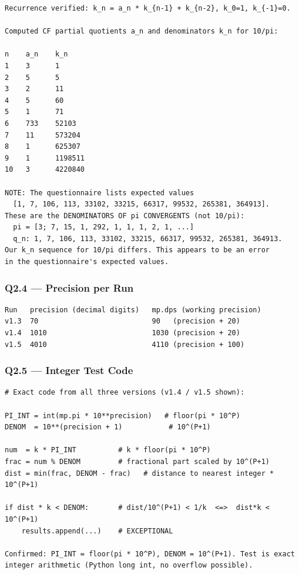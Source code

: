 \documentclass[11pt,a4paper]{article}
\begin{document}
\begin{lstlisting}
Recurrence verified: k_n = a_n * k_{n-1} + k_{n-2}, k_0=1, k_{-1}=0.

Computed CF partial quotients a_n and denominators k_n for 10/pi:

n    a_n    k_n
1    3      1
2    5      5
3    2      11
4    5      60
5    1      71
6    733    52103
7    11     573204
8    1      625307
9    1      1198511
10   3      4220840

NOTE: The questionnaire lists expected values
  [1, 7, 106, 113, 33102, 33215, 66317, 99532, 265381, 364913].
These are the DENOMINATORS OF pi CONVERGENTS (not 10/pi):
  pi = [3; 7, 15, 1, 292, 1, 1, 1, 2, 1, ...]
  q_n: 1, 7, 106, 113, 33102, 33215, 66317, 99532, 265381, 364913.
Our k_n sequence for 10/pi differs. This appears to be an error
in the questionnaire's expected values.
\end{lstlisting}

\subsubsection*{Q2.4 --- Precision per Run}

\begin{lstlisting}
Run   precision (decimal digits)   mp.dps (working precision)
v1.3  70                           90   (precision + 20)
v1.4  1010                         1030 (precision + 20)
v1.5  4010                         4110 (precision + 100)
\end{lstlisting}

\subsubsection*{Q2.5 --- Integer Test Code}

\begin{lstlisting}
# Exact code from all three versions (v1.4 / v1.5 shown):

PI_INT = int(mp.pi * 10**precision)   # floor(pi * 10^P)
DENOM  = 10**(precision + 1)           # 10^(P+1)

num  = k * PI_INT          # k * floor(pi * 10^P)
frac = num % DENOM         # fractional part scaled by 10^(P+1)
dist = min(frac, DENOM - frac)   # distance to nearest integer * 10^(P+1)

if dist * k < DENOM:       # dist/10^(P+1) < 1/k  <=>  dist*k < 10^(P+1)
    results.append(...)    # EXCEPTIONAL

Confirmed: PI_INT = floor(pi * 10^P), DENOM = 10^(P+1). Test is exact
integer arithmetic (Python long int, no overflow possible).
\end{lstlisting}
\end{document}
